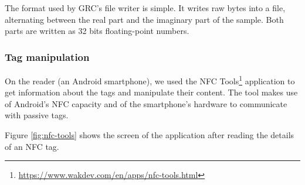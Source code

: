 The format used by GRC's file writer is simple. It writes raw bytes into a file, alternating between the real part and the imaginary part of the sample. Both parts are written as 32 bits floating-point numbers.

\subsubsection{Tag manipulation}

On the reader (an Android smartphone), we used the NFC Tools\footnote{\url{https://www.wakdev.com/en/apps/nfc-tools.html}} application to get information about the tags and manipulate their content. The tool makes use of Android's NFC capacity and of the smartphone's hardware to communicate with passive tags.

Figure \ref{fig:nfc-tools} shows the screen of the application after reading the details of an NFC tag.

